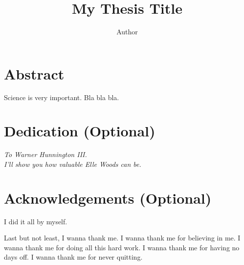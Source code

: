 \title{My Thesis Title}
\author{Author}


\pagestyle{empty}
\titlep %


\cleardoublepage
\pagestyle{plain} 
\section*{Abstract}

Science is very important. Bla bla bla.


\cleardoublepage
\pagestyle{plain} 
\section*{Dedication (Optional)}
    \vspace{0.25\textheight}
    \begin{center}
        \textit{To Warner Hunnington III. \\ I'll show you how valuable Elle Woods can be.}
    \end{center}



\cleardoublepage
\pagestyle{plain} 
\section*{Acknowledgements (Optional)}

I did it all by myself.

Last but not least, I wanna thank me. I wanna thank me for believing in me. I wanna thank me for doing all this hard work. I wanna thank me for having no days off. I wanna thank me for never quitting.

